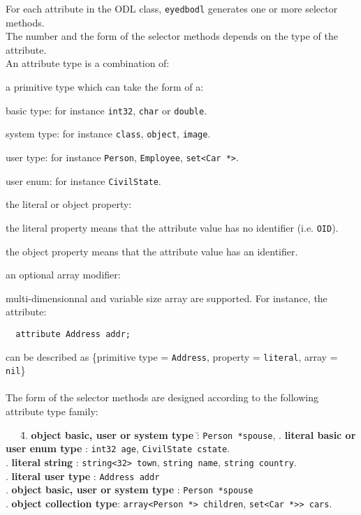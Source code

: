 For each attribute in the ODL class, \texttt{eyedbodl} generates one or more
selector methods.
\\
The number and the form of the selector methods depends on the type
of the attribute.
\\
An attribute type is a combination of:
\be
\item a primitive type which can take the form of a:
\be
\item basic type: for instance \texttt{int32}, \texttt{char} or \texttt{double}.
\item system type: for instance \texttt{class}, \texttt{object}, \texttt{image}.
\item user type: for instance \texttt{Person}, \texttt{Employee},
\texttt{set<Car *>}.
\item user enum: for instance \texttt{CivilState}.
\ee
\item the literal or object property:
\be
\item the literal property means that the attribute value has no identifier
(i.e. \texttt{OID}).
\item the object property means that the attribute value has an identifier.
\ee
\item an optional array modifier:
\be
\item multi-dimensionnal and variable size array are supported.
\ee
\ee
For instance, the attribute:
\verbsize
\begin{verbatim}
  attribute Address addr;
\end{verbatim}
\normalsize
can be described as
\{primitive type = \texttt{Address}, property = \texttt{literal}, array = \texttt{nil}\}
\\
\\
The form of the selector methods are designed according to the
following attribute type family:
\begin{tabbing}
\mbox{ }\mbox{ }\mbox{ }\=4. {\bf object basic, user or system type} \= : \texttt{Person *spouse},\kill
{}. {\bf literal basic or user enum type} \>: \texttt{int32 age}, \texttt{CivilState cstate}.\\
. {\bf literal string} \>: \texttt{string<32> town}, \texttt{string name},
\texttt{string country}.\\
. {\bf literal user type} \>: \texttt{Address addr}\\
. {\bf object basic, user or system type} \>: \texttt{Person *spouse}\\
. {\bf object collection type}\>: \texttt{array<Person *> children}, \texttt{set<Car *>> cars}.\\
\end{tabbing}
